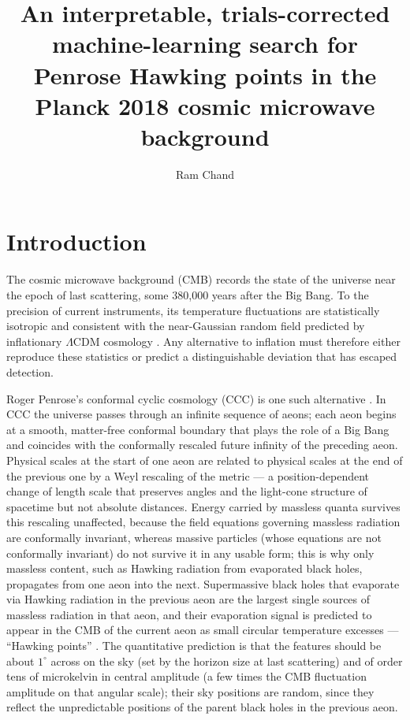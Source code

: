 \documentclass[a4paper,11pt]{article}
\title{An interpretable, trials-corrected machine-learning search for Penrose Hawking points in the Planck 2018 cosmic microwave background}
\author{Ram Chand}
\affiliation{Department of Natural Sciences, The Begum Nusrat Bhutto Women University,\\Sukkur, Sindh, Pakistan}
\begin{document}
\maketitle
\flushbottom

\section{Introduction}\label{sec:intro}

The cosmic microwave background (CMB) records the state of the universe near the epoch of last scattering, some 380{,}000 years after the Big Bang. To the precision of current instruments, its temperature fluctuations are statistically isotropic and consistent with the near-Gaussian random field predicted by inflationary $\Lambda$CDM cosmology \citep{planck2018_i,planck2018_vi}. Any alternative to inflation must therefore either reproduce these statistics or predict a distinguishable deviation that has escaped detection.

Roger Penrose's conformal cyclic cosmology (CCC) is one such alternative \citep{penrose_ccc_2010}. In CCC the universe passes through an infinite sequence of aeons; each aeon begins at a smooth, matter-free conformal boundary that plays the role of a Big Bang and coincides with the conformally rescaled future infinity of the preceding aeon. Physical scales at the start of one aeon are related to physical scales at the end of the previous one by a Weyl rescaling of the metric --- a position-dependent change of length scale that preserves angles and the light-cone structure of spacetime but not absolute distances. Energy carried by massless quanta survives this rescaling unaffected, because the field equations governing massless radiation are conformally invariant, whereas massive particles (whose equations are not conformally invariant) do not survive it in any usable form; this is why only massless content, such as Hawking radiation from evaporated black holes, propagates from one aeon into the next. Supermassive black holes that evaporate via Hawking radiation \citep{hawking_1975} in the previous aeon are the largest single sources of massless radiation in that aeon, and their evaporation signal is predicted to appear in the CMB of the current aeon as small circular temperature excesses --- ``Hawking points'' \citep{an_amnp_2018}. The quantitative prediction is that the features should be about $1^\circ$ across on the sky (set by the horizon size at last scattering) and of order tens of microkelvin in central amplitude (a few times the CMB fluctuation amplitude on that angular scale); their sky positions are random, since they reflect the unpredictable positions of the parent black holes in the previous aeon.
\end{document}
